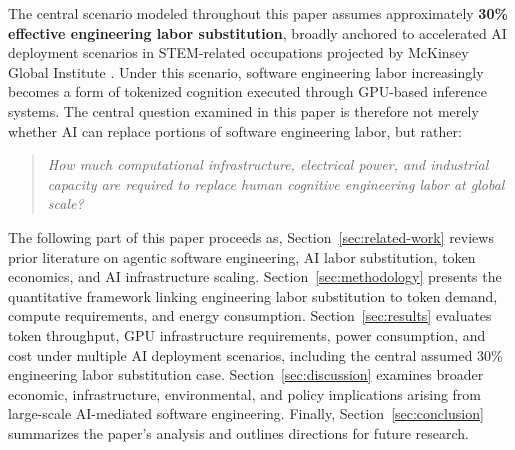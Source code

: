 \documentclass{article}
\newcommand{\VERIFY}{\textcolor{red}{\textbf{[VERIFY]}}}
\begin{document}
The central scenario modeled throughout this paper assumes approximately \textbf{30\% effective engineering labor substitution}, broadly anchored to accelerated AI deployment scenarios in STEM-related occupations projected by McKinsey Global Institute \citep{mckinsey2024future}. Under this scenario, software engineering labor increasingly becomes a form of tokenized cognition executed through GPU-based inference systems. The central question examined in this paper is therefore not merely whether AI can replace portions of software engineering labor, but rather:

\begin{quote}
\textit{How much computational infrastructure, electrical power, and industrial capacity are required to replace human cognitive engineering labor at global scale?}
\end{quote}

The following part of this paper proceeds as, Section~\ref{sec:related-work} reviews prior literature on agentic software engineering, AI labor substitution, token economics, and AI infrastructure scaling. Section~\ref{sec:methodology} presents the quantitative framework linking engineering labor substitution to token demand, compute requirements, and energy consumption. Section~\ref{sec:results} evaluates token throughput, GPU infrastructure requirements, power consumption, and cost under multiple AI deployment scenarios, including the central assumed 30\% engineering labor substitution case. Section~\ref{sec:discussion} examines broader economic, infrastructure, environmental, and policy implications arising from large-scale AI-mediated software engineering. Finally, Section~\ref{sec:conclusion} summarizes the paper's analysis and outlines directions for future research.


\end{document}
